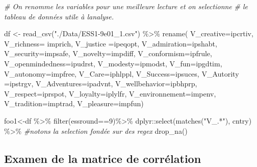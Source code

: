 \documentclass[
]{book}
\newenvironment{Shaded}{\begin{snugshade}}{\end{snugshade}}
\newcommand{\AttributeTok}[1]{\textcolor[rgb]{0.77,0.63,0.00}{#1}}
\newcommand{\CommentTok}[1]{\textcolor[rgb]{0.56,0.35,0.01}{\textit{#1}}}
\newcommand{\DecValTok}[1]{\textcolor[rgb]{0.00,0.00,0.81}{#1}}
\newcommand{\FunctionTok}[1]{\textcolor[rgb]{0.00,0.00,0.00}{#1}}
\newcommand{\NormalTok}[1]{#1}
\newcommand{\OtherTok}[1]{\textcolor[rgb]{0.56,0.35,0.01}{#1}}
\newcommand{\SpecialCharTok}[1]{\textcolor[rgb]{0.00,0.00,0.00}{#1}}
\newcommand{\StringTok}[1]{\textcolor[rgb]{0.31,0.60,0.02}{#1}}
\begin{document}
\begin{Shaded}
\begin{Highlighting}[]
\CommentTok{\# On renomme les variables pour une meilleure lecture et on selectionne }
\CommentTok{\# le tableau de données utile à l\textquotesingle{}analyse.}

\NormalTok{df }\OtherTok{\textless{}{-}} \FunctionTok{read\_csv}\NormalTok{(}\StringTok{"./Data/ESS1{-}9e01\_1.csv"}\NormalTok{) }\SpecialCharTok{\%\textgreater{}\%}
  \FunctionTok{rename}\NormalTok{(}
    \AttributeTok{V\_creative=}\NormalTok{ipcrtiv,}
    \AttributeTok{V\_richness=}\NormalTok{ imprich,}
    \AttributeTok{V\_justice =}\NormalTok{ipeqopt, }
    \AttributeTok{V\_admiration=}\NormalTok{ipshabt, }
    \AttributeTok{V\_security=}\NormalTok{impsafe, }
    \AttributeTok{V\_novelty=}\NormalTok{impdiff, }
    \AttributeTok{V\_conformism=}\NormalTok{ipfrule, }
    \AttributeTok{V\_openmindedness=}\NormalTok{ipudrst, }
    \AttributeTok{V\_modesty=}\NormalTok{ipmodst, }
    \AttributeTok{V\_fun=}\NormalTok{ipgdtim, }
    \AttributeTok{V\_autonomy=}\NormalTok{impfree, }
    \AttributeTok{V\_Care=}\NormalTok{iphlppl, }
    \AttributeTok{V\_Success=}\NormalTok{ipsuces,}
    \AttributeTok{V\_Autority =}\NormalTok{ipstrgv, }
    \AttributeTok{V\_Adventures=}\NormalTok{ipadvnt,}
    \AttributeTok{V\_wellbehavior=}\NormalTok{ipbhprp,}
    \AttributeTok{V\_respect=}\NormalTok{iprspot,}
    \AttributeTok{V\_loyalty=}\NormalTok{iplylfr,}
    \AttributeTok{V\_environnement=}\NormalTok{impenv,}
    \AttributeTok{V\_tradition=}\NormalTok{imptrad, }
    \AttributeTok{V\_pleasure=}\NormalTok{impfun)}

\NormalTok{foo1}\OtherTok{\textless{}{-}}\NormalTok{df }\SpecialCharTok{\%\textgreater{}\%} \FunctionTok{filter}\NormalTok{(essround}\SpecialCharTok{==}\DecValTok{9}\NormalTok{)}\SpecialCharTok{\%\textgreater{}\%}
\NormalTok{  dplyr}\SpecialCharTok{::}\FunctionTok{select}\NormalTok{(}\FunctionTok{matches}\NormalTok{(}\StringTok{"V\_.*"}\NormalTok{), cntry) }\SpecialCharTok{\%\textgreater{}\%} \CommentTok{\#notons la selection fondée sur des regex}
  \FunctionTok{drop\_na}\NormalTok{()}
\end{Highlighting}
\end{Shaded}

\hypertarget{examen-de-la-matrice-de-corruxe9lation}{%
\subsection{Examen de la matrice de corrélation}\label{examen-de-la-matrice-de-corruxe9lation}}
\end{document}

